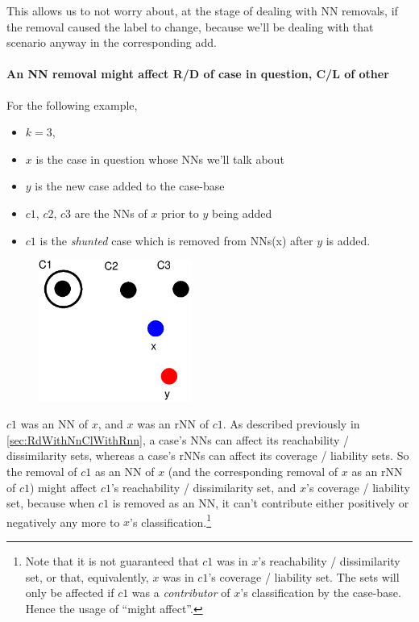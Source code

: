 \documentclass[a4paper,11pt]{report}
\begin{document}
This allows us to not worry about, at the stage of dealing with NN removals, if the removal caused the label to change, because we'll be dealing with that scenario anyway in the corresponding add.

\paragraph{An NN removal might affect R/D of case in question, C/L of other}

For the following example,
\begin{itemize}
	\item $k=3$, 
	\item $x$ is the case in question whose NNs  we'll talk about
	\item $y$ is the new case added to the case-base
	\item $c1$, $c2$, $c3$ are the NNs of $x$ prior to $y$ being added
	\item $c1$ is the \emph{shunted} case which is removed from NNs(x) after $y$ is added.
\end{itemize}

\begin{figure}[h!] \centering
\includegraphics[width=5cm]{./Drawn/NnMightAffectEg}
\end{figure}

$c1$ was an NN of $x$, and $x$ was an rNN of $c1$. As described previously in \ref{sec:RdWithNnClWithRnn}, a case's NNs can affect its reachability / dissimilarity sets, whereas a case's rNNs can affect its coverage / liability sets. So the removal of $c1$ as an NN of $x$ (and the corresponding removal of $x$ as an rNN of $c1$) might affect $c1$'s reachability / dissimilarity set, and $x$'s coverage / liability set, because when $c1$ is removed as an NN, it can't contribute either positively or negatively any more to $x$'s classification.\footnote{Note that it is not guaranteed that $c1$ was in $x$'s reachability / dissimilarity set, or that, equivalently, $x$ was in $c1$'s coverage / liability set. The sets will only be affected if $c1$ was a \emph{contributor} of $x$'s classification by the case-base. Hence the usage of ``might affect''.}
\end{document}
